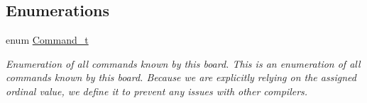 \subsection*{Enumerations}
\begin{DoxyCompactItemize}
\item 
enum \hyperlink{group__command__interpreter_gafe8d33d42ee3ed4867090180ef38afbd}{Command\-\_\-t} 
\begin{DoxyCompactList}\small\item\em Enumeration of all commands known by this board. This is an enumeration of all commands known by this board. Because we are explicitly relying on the assigned ordinal value, we define it to prevent any issues with other compilers. \end{DoxyCompactList}\end{DoxyCompactItemize}
